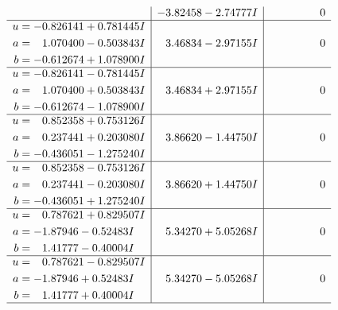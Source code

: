 \documentclass[1p]{elsarticle_modified}
\theoremstyle{definition}
\begin{document}
$$\begin{array}{c|c|c}
 & -3.82458 - 2.74777 I & \phantom{-0.000000 } 0 \\ \hline\begin{aligned}
u &= -0.826141 + 0.781445 I \\
a &= \phantom{-}1.070400 - 0.503843 I \\
b &= -0.612674 + 1.078900 I\end{aligned}
 & \phantom{-}3.46834 - 2.97155 I & \phantom{-0.000000 } 0 \\ \hline\begin{aligned}
u &= -0.826141 - 0.781445 I \\
a &= \phantom{-}1.070400 + 0.503843 I \\
b &= -0.612674 - 1.078900 I\end{aligned}
 & \phantom{-}3.46834 + 2.97155 I & \phantom{-0.000000 } 0 \\ \hline\begin{aligned}
u &= \phantom{-}0.852358 + 0.753126 I \\
a &= \phantom{-}0.237441 + 0.203080 I \\
b &= -0.436051 - 1.275240 I\end{aligned}
 & \phantom{-}3.86620 - 1.44750 I & \phantom{-0.000000 } 0 \\ \hline\begin{aligned}
u &= \phantom{-}0.852358 - 0.753126 I \\
a &= \phantom{-}0.237441 - 0.203080 I \\
b &= -0.436051 + 1.275240 I\end{aligned}
 & \phantom{-}3.86620 + 1.44750 I & \phantom{-0.000000 } 0 \\ \hline\begin{aligned}
u &= \phantom{-}0.787621 + 0.829507 I \\
a &= -1.87946 - 0.52483 I \\
b &= \phantom{-}1.41777 - 0.40004 I\end{aligned}
 & \phantom{-}5.34270 + 5.05268 I & \phantom{-0.000000 } 0 \\ \hline\begin{aligned}
u &= \phantom{-}0.787621 - 0.829507 I \\
a &= -1.87946 + 0.52483 I \\
b &= \phantom{-}1.41777 + 0.40004 I\end{aligned}
 & \phantom{-}5.34270 - 5.05268 I & \phantom{-0.000000 } 0\\
 \hline 
 \end{array}$$\newpage$$\begin{array}{c|c|c}  

\end{array}$$
\end{document}
